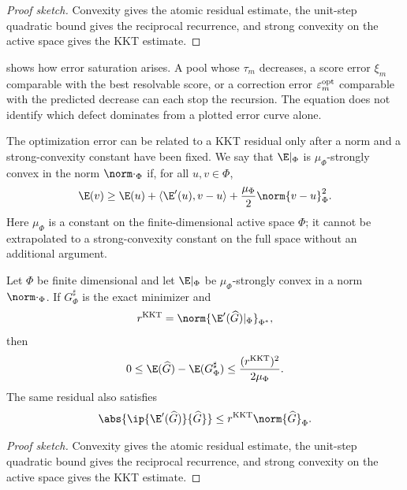 \begin{proof}[Proof sketch]
Convexity gives the atomic residual estimate, the unit-step quadratic bound gives the reciprocal recurrence, and strong convexity on the active space gives the KKT estimate.
\end{proof}

\begin{remark}
 shows how error saturation arises. A pool whose
\(\tau_m\) decreases, a score error \(\xi_m\) comparable with the best resolvable score, or a correction
error \(\varepsilon_m^{\rm opt}\) comparable with the predicted decrease can each stop the recursion. The equation
does not identify which defect dominates from a plotted error curve alone.
\end{remark}

The optimization error can be related to a KKT residual only after a norm and a strong-convexity
constant have been fixed. We say that $\E|_\Phi$ is $\mu_\Phi$-strongly convex in the norm
$\norm\cdot_\Phi$ if, for all $u,v\in\Phi$,
\[
 \E(v)\geq \E(u)+\langle\E'(u),v-u\rangle
       +\frac{\mu_\Phi}{2}\norm{v-u}_\Phi^2 .
\]
Here $\mu_\Phi$ is a constant on the finite-dimensional active space $\Phi$; it
cannot be extrapolated to a strong-convexity constant on the full space without an
additional argument.

\begin{lemma}
\label{lem:kkt}
Let \(\Phi\) be finite dimensional and let \(\E|_\Phi\) be \(\mu_\Phi\)-strongly convex in a norm
\(\norm\cdot_\Phi\). If \(G_\Phi^{\sharp}\) is the exact minimizer and
\[
 r^{\mathrm{KKT}}=\norm{\E'(\widehat G)|_\Phi}_{\Phi^*},
\]
then
\begin{equation}
 0\leq\E(\widehat G)-\E(G_\Phi^{\sharp})
 \leq\frac{(r^{\mathrm{KKT}})^2}{2\mu_\Phi}.
\label{eq:kkt-energy}
\end{equation}
The same residual also satisfies
\begin{equation}
 \abs{\ip{\E'(\widehat G)}{\widehat G}}
 \leq r^{\mathrm{KKT}}\norm{\widehat G}_\Phi.
\label{eq:kkt-orth}
\end{equation}
\end{lemma}

\begin{proof}[Proof sketch]
Convexity gives the atomic residual estimate, the unit-step quadratic bound gives the reciprocal recurrence, and strong convexity on the active space gives the KKT estimate.
\end{proof}
